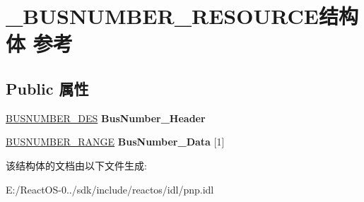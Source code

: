 \hypertarget{struct___b_u_s_n_u_m_b_e_r___r_e_s_o_u_r_c_e}{}\section{\+\_\+\+B\+U\+S\+N\+U\+M\+B\+E\+R\+\_\+\+R\+E\+S\+O\+U\+R\+C\+E结构体 参考}
\label{struct___b_u_s_n_u_m_b_e_r___r_e_s_o_u_r_c_e}
\subsection*{Public 属性}
\begin{DoxyCompactItemize}
\item 
\mbox{\label{struct___b_u_s_n_u_m_b_e_r___r_e_s_o_u_r_c_e_a920af6bed02e0195a77316a06f565e06}} 
\hyperlink{struct_bus_number___des__s}{B\+U\+S\+N\+U\+M\+B\+E\+R\+\_\+\+D\+ES} {\bfseries Bus\+Number\+\_\+\+Header}
\item 
\mbox{\label{struct___b_u_s_n_u_m_b_e_r___r_e_s_o_u_r_c_e_a1a3b9fe088c4c2dfe183dc7fe11ecdd3}} 
\hyperlink{struct_bus_number___range__s}{B\+U\+S\+N\+U\+M\+B\+E\+R\+\_\+\+R\+A\+N\+GE} {\bfseries Bus\+Number\+\_\+\+Data} \mbox{[}1\mbox{]}
\end{DoxyCompactItemize}


该结构体的文档由以下文件生成\+:\begin{DoxyCompactItemize}
\item 
E\+:/\+React\+O\+S-\/0../sdk/include/reactos/idl/pnp.\+idl\end{DoxyCompactItemize}
